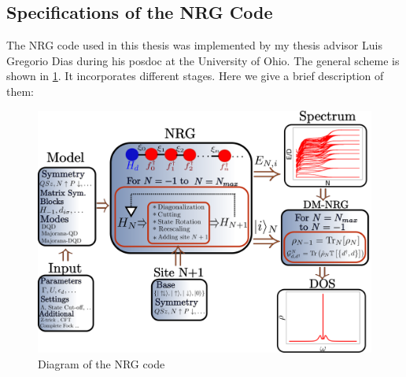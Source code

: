 





\subsection{Specifications of the NRG Code }

The NRG code used in this thesis was implemented by my thesis advisor Luis Gregorio Dias during his posdoc at the University of Ohio.  The general scheme  is shown in \ref{fig:Code}. It incorporates different stages. Here we give a brief description of them:

\begin{figure}[t]
\centering
\includegraphics[scale=0.4]{IMAGES/NRG/NRGcode.png}
\caption{\label{fig:Code} Diagram of the NRG code}
\end{figure}


